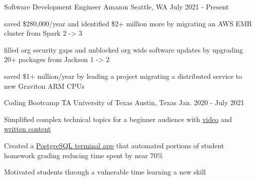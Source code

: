 

\begin{cventries}

  \cventry
    {Software Development Engineer} %
    {Amazon} %
    {Seattle, WA} %
    {July 2021 - Present} %
    {
      \begin{cvitems} %
        \item {saved \$280,000/year and identified \$2+ million more by migrating an AWS EMR cluster from Spark 2 -> 3}
        \item {filled org security gaps and unblocked org wide software updates by upgrading 20+ packages from Jackson 1 -> 2}
        \item {saved \$1+ million/year by leading a project migrating a distributed service to new Graviton ARM CPUs}
      \end{cvitems}
    }

  \cventry
    {Coding Bootcamp TA} %
    {University of Texas} %
    {Austin, Texas} %
    {Jan. 2020 - July 2021} %
    {
      \begin{cvitems} %
        \item {Simplified complex technical topics for a beginner audience with \href{https://youtu.be/G4tDjGUD-T4}{video} and \href{https://www.linkedin.com/pulse/how-deal-knowledge-work-frustration-geoff-langenderfer/?trackingId=Z6YGiHpVRFi4PCNxybaPfw\%3D\%3D}{written content}}
        \item {Created a \href{https://youtu.be/ELCZ5dAS6Zg}{PostgreSQL terminal app} that automated portions of student homework grading reducing time spent by near 70\%}
        \item {Motivated students through a vulnerable time learning a new skill}
      \end{cvitems}
    }

\end{cventries}
